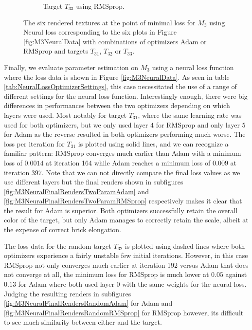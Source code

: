 \begin{figure}
\begin{subfigure}[t]{.25\textwidth}
    \caption{Target $T_{33}$ using RMSprop.}
    \label{fig:M3NeuralFinalRendersRealLifeRMSprop}
\end{subfigure}
\caption{The six rendered textures at the point of minimal loss for $M_3$ using Neural loss corresponding to the six plots in Figure \ref{fig:M3NeuralData} with combinations of optimizers Adam or RMSprop and targets $T_{31}$, $T_{32}$ or $T_{33}$.}
\label{fig:M3NeuralFinalRenders}
\end{figure}

Finally, we evaluate parameter estimation on $M_3$ using a neural loss function where the loss data is shown in Figure \ref{fig:M3NeuralData}. As seen in table \ref{tab:NeuralLossOptimizerSettings}, this case necessitated the use of a range of different settings for the neural loss function. Interestingly enough, there were big differences in performances between the two optimizers depending on which layers were used. Most notably for target $T_{31}$, where the same learning rate was used for both optimizers, but we only used layer $4$ for RMSprop and only layer $5$ for Adam as the reverse resulted in both optimizers performing much worse. The loss per iteration for $T_{31}$ is plotted using solid lines, and we can recognize a familiar pattern: RMSprop converges much earlier than Adam with a minimum loss of $0.0014$ at iteration 164 while Adam reaches a minimum loss of $0.009$ at iteration 397. Note that we can not directly compare the final loss values as we use different layers but the final renders shown in subfigures \ref{fig:M3NeuralFinalRendersTwoParamAdam} and \ref{fig:M3NeuralFinalRendersTwoParamRMSprop} respectively makes it clear that the result for Adam is superior. Both optimizers successfully retain the overall color of the target, but only Adam manages to correctly retain the scale, albeit at the expense of correct brick elongation. 

The loss data for the random target $T_{32}$ is plotted using dashed lines where both optimizers experience a fairly unstable few initial iterations. However, in this case RMSprop not only converges much earlier at iteration 192 versus Adam that does not converge at all, the minimum loss for RMSprop is much lower at $0.05$ against $0.13$ for Adam where both used layer $0$ with the same weights for the neural loss. Judging the resulting renders in subfigures \ref{fig:M3NeuralFinalRendersRandomAdam} for Adam and \ref{fig:M3NeuralFinalRendersRandomRMSprop} for RMSprop however, its difficult to see much similarity between either and the target.


